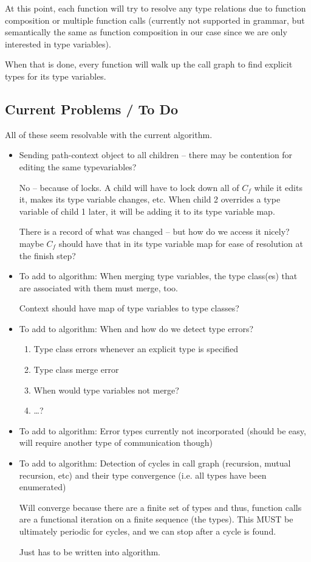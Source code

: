\documentclass[10pt]{article}
\begin{document}
At this point, each function will try to resolve any type relations due to
function composition or multiple function calls (currently not supported in
grammar, but semantically the same as function composition in our case since we
are only interested in type variables).

When that is done, every function will walk up the call graph to find explicit
types for its type variables.

\subsection{Current Problems / To Do}

All of these seem resolvable with the current algorithm.

\begin{itemize}
	\item Sending path-context object to all children -- there may be
		contention for editing the same typevariables?

		No -- because of locks. A child will have to lock down all of $C_f$
		while it edits it, makes its type variable changes, etc. When child 2
		overrides a type variable of child 1 later, it will be adding it to its
		type variable map. 
		
		There is a record of what was changed -- but how do
		we access it nicely? maybe $C_f$ should have that in its type variable
		map for ease of resolution at the finish step?

	\item To add to algorithm: When merging type variables, the type class(es)
		that are associated with them must merge, too. 

		Context should have map of type variables to type classes?

	\item To add to algorithm: When and how do we detect type errors?

		\begin{enumerate}
			\item Type class errors whenever an explicit type is specified
			\item Type class merge error
			\item When would type variables not merge?
			\item \ldots?
		\end{enumerate}

	\item To add to algorithm: Error types currently not incorporated (should
		be easy, will require another type of communication though)

	\item To add to algorithm: Detection of cycles in call graph (recursion,
		mutual recursion, etc) and their type convergence (i.e. all types have
		been enumerated)

		Will converge because there are a finite set of types and thus,
		function calls are a functional iteration on a finite sequence (the
		types). This MUST be ultimately periodic for cycles, and we can stop
		after a cycle is found.

		Just has to be written into algorithm.
\end{itemize}
\end{document}
